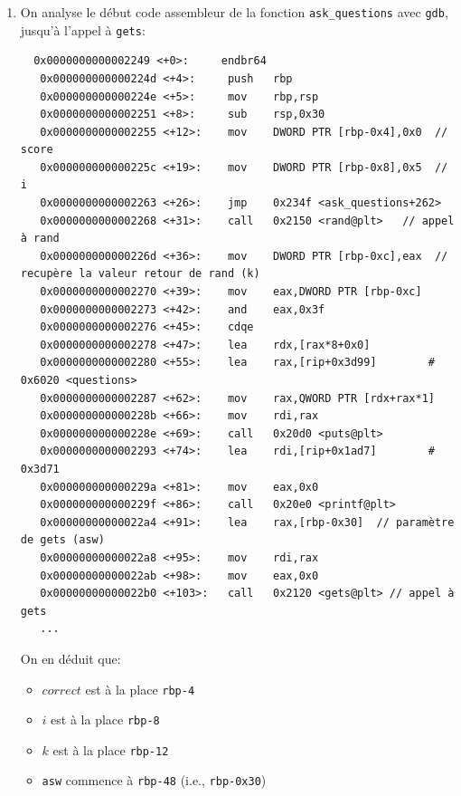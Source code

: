 \documentclass[a4paper,9pt]{article}
\newenvironment{terminal}{\color{black}\begin{snugshade*}}
{\end{snugshade*}\color{black}}
\theoremstyle{plain}
\theoremstyle{definition}
\begin{document}
\begin{correction}
\begin{enumerate}
\item On analyse le début code assembleur de la fonction \verb|ask_questions| avec \verb|gdb|, jusqu'à l'appel à \verb|gets|:
\begin{terminal}
\begin{verbatim}
  0x0000000000002249 <+0>:     endbr64 
   0x000000000000224d <+4>:     push   rbp
   0x000000000000224e <+5>:     mov    rbp,rsp
   0x0000000000002251 <+8>:     sub    rsp,0x30
   0x0000000000002255 <+12>:    mov    DWORD PTR [rbp-0x4],0x0  // score
   0x000000000000225c <+19>:    mov    DWORD PTR [rbp-0x8],0x5  // i
   0x0000000000002263 <+26>:    jmp    0x234f <ask_questions+262>
   0x0000000000002268 <+31>:    call   0x2150 <rand@plt>   // appel à rand
   0x000000000000226d <+36>:    mov    DWORD PTR [rbp-0xc],eax  // recupère la valeur retour de rand (k)
   0x0000000000002270 <+39>:    mov    eax,DWORD PTR [rbp-0xc]
   0x0000000000002273 <+42>:    and    eax,0x3f
   0x0000000000002276 <+45>:    cdqe   
   0x0000000000002278 <+47>:    lea    rdx,[rax*8+0x0]
   0x0000000000002280 <+55>:    lea    rax,[rip+0x3d99]        # 0x6020 <questions>
   0x0000000000002287 <+62>:    mov    rax,QWORD PTR [rdx+rax*1]
   0x000000000000228b <+66>:    mov    rdi,rax
   0x000000000000228e <+69>:    call   0x20d0 <puts@plt>
   0x0000000000002293 <+74>:    lea    rdi,[rip+0x1ad7]        # 0x3d71
   0x000000000000229a <+81>:    mov    eax,0x0
   0x000000000000229f <+86>:    call   0x20e0 <printf@plt>
   0x00000000000022a4 <+91>:    lea    rax,[rbp-0x30]  // paramètre de gets (asw) 
   0x00000000000022a8 <+95>:    mov    rdi,rax
   0x00000000000022ab <+98>:    mov    eax,0x0
   0x00000000000022b0 <+103>:   call   0x2120 <gets@plt> // appel à gets
   ...
\end{verbatim}
\end{terminal}
On en déduit que: 
\begin{itemize}
\item $correct$ est à la place \verb|rbp-4|
\item $i$ est à la place \verb|rbp-8|
\item $k$ est à la place \verb|rbp-12|
\item \verb|asw| commence à \verb|rbp-48| (i.e., \verb|rbp-0x30|)
\end{itemize}



\end{enumerate}
\end{correction}
\end{document}
